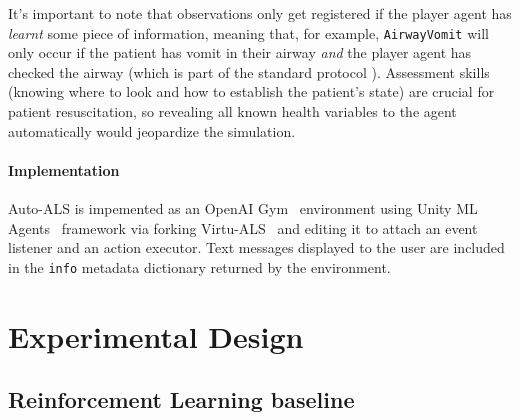 It's important to note that observations only get registered if the player agent has \emph{learnt} some piece of information, meaning that, for example, \verb|AirwayVomit| will only occur if the patient has vomit in their airway \emph{and} the player agent has checked the airway (which is part of the standard protocol \cite{thimInitialAssessmentTreatment2012}).
Assessment skills (knowing where to look and how to establish the patient's state) are crucial for patient resuscitation, so revealing all known health variables to the agent automatically would jeopardize the simulation.

\paragraph{Implementation}

Auto-ALS is impemented as an OpenAI Gym~\cite{liventsevVadim0x60Autoals2024} environment using Unity ML Agents~\cite{almon-manzanoDeepReinforcementLearning2022, julianiUnityGeneralPlatform2020, lanhamLearnUnityMLAgentsfundamentals2018, nandyUnityMLAgents2018} framework via forking Virtu-ALS~\cite{liventsevVadim0x60Virtualsplus2024} and editing it to attach an event listener and an action executor.
Text messages displayed to the user are included in the \texttt{info} metadata dictionary returned by the environment.

\newpage
\section{Experimental Design}
\label{sec:auto-als-exp}

\subsection{Reinforcement Learning baseline}

